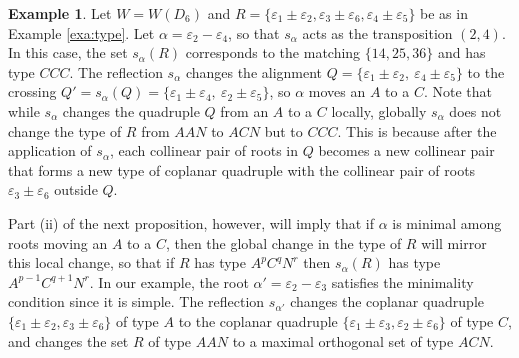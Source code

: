 \documentclass[11pt]{amsart}
\theoremstyle{plain}
\theoremstyle{definition}
\newtheorem{exa}[theorem]{Example}
\theoremstyle{remark}
\numberwithin{equation}{subsection}
\newcommand{\al}{\alpha}
\newcommand{\ep}{\varepsilon}
\begin{document}
\begin{exa}\label{exa:moves}
Let $W=W(D_6)$ and $R=\{\ep_1 \pm \ep_2,\ep_3\pm\ep_6,\ep_4 \pm \ep_5\}$ be as
in Example \ref{exa:type}. Let $\al = \ep_2 - \ep_4$, so that $s_\al$ acts as
the transposition $(2, 4)$.  In this case, the set $s_\al(R)$  corresponds to
the matching $\{14,25,36\}$ and has type $CCC$. The reflection $s_\al$ changes
the alignment $Q = \{\ep_1 \pm \ep_2, \ \ep_4 \pm \ep_5\}$ to the crossing
$Q'=s_\al(Q) = \{\ep_1 \pm \ep_4, \ \ep_2 \pm \ep_5\}$, so $\al$ moves an $A$ to
a $C$.  Note that while $s_\al$ changes the quadruple $Q$  from an $A$ to a $C$
locally, globally $s_\al$ does not change the type of $R$ from $AAN$ to $ACN$
but to $CCC$. This is because after the application of $s_\al$, each collinear
pair of roots in $Q$ becomes a new collinear pair that forms a new type of
coplanar quadruple with the collinear pair of roots $\ep_3\pm\ep_6$ outside $Q$.

Part (ii) of the next proposition, however, will imply that if $\al$ is minimal
among roots moving an $A$ to a $C$, then the global change in the type of $R$
will mirror this local change, so that if $R$ has type $A^pC^qN^r$ then
$s_\al(R)$ has type $A^{p-1}C^{q+1}N^r$. In our example, the root
$\al'=\ep_2-\ep_3$ satisfies the minimality condition since it is simple. The
reflection $s_{\al'}$ changes the coplanar quadruple
$\{\ep_1\pm\ep_2,\ep_3\pm\ep_6\}$ of type $A$ to the coplanar quadruple
$\{\ep_1\pm\ep_3,\ep_2\pm\ep_6\}$ of type $C$, and changes the set $R$ of type
$AAN$ to a maximal orthogonal set of type $ACN$.
\end{exa}
\end{document}

